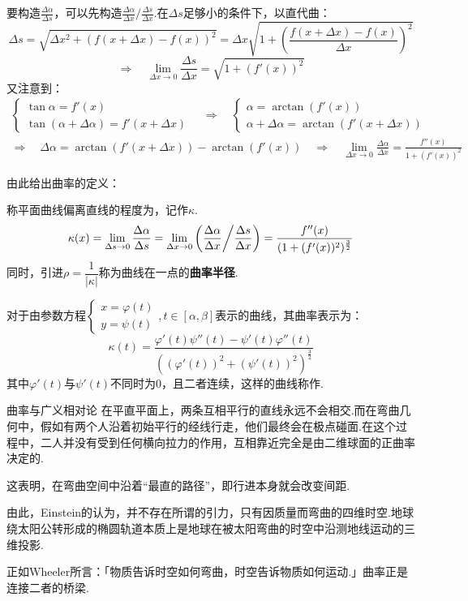 要构造$\frac{\Delta\alpha}{\Delta s}$，可以先构造$\frac{\Delta \alpha}{\Delta x}\big/\frac{\Delta s}{\Delta x}$.在$\Delta s$足够小的条件下，以直代曲：
\[\Delta s = \sqrt{\Delta x^2 + (f(x+\Delta x) - f(x))^2} = \Delta x \sqrt{1+\left(\frac{f(x+\Delta x)-f(x)}{\Delta x}\right)^2}\]
\[\Rightarrow\quad \lim\limits_{\Delta x \to 0}\frac{\Delta s}{\Delta x} = \sqrt{1+(f'(x))^2}\]
又注意到：
\begin{gather*}
\begin{cases}
    \tan \alpha = f'(x)\\
    \tan(\alpha + \Delta\alpha) = f'(x+\Delta x)
\end{cases} \quad\Rightarrow\quad \begin{cases}
    \alpha = \arctan(f'(x))\\
    \alpha + \Delta\alpha = \arctan(f'(x+\Delta x))
\end{cases}\\
\Rightarrow\quad \Delta\alpha = \arctan(f'(x+\Delta x)) - \arctan(f'(x))
\quad\Rightarrow\quad \lim\limits_{\Delta x \to 0}\frac{\Delta\alpha}{\Delta x} = \frac{f''(x)}{1+(f'(x))^2}
\end{gather*}

由此给出曲率的定义：

\begin{definition}
    \label{def:2DCurvature}
    称平面曲线偏离直线的程度为，记作$\kappa$.
    \[\kappa(x) = \lim\limits_{\Delta s \to 0}\frac{\Delta\alpha}{\Delta s} = \lim\limits_{\Delta x \to 0}\left(\frac{\Delta\alpha}{\Delta x}\middle/\frac{\Delta s}{\Delta x}\right) = \frac{f''(x)}{(1+(f'(x))^2)^{\frac{3}{2}}}\]
    同时，引进$\rho = \dfrac{1}{|\kappa|}$称为曲线在一点的\textbf{曲率半径}.

    对于由参数方程$\begin{cases}
        x = \varphi(t) \\
        y = \psi(t)
    \end{cases},t\in [\alpha,\beta]$表示的曲线，其曲率表示为：
    \[\kappa(t) = \frac{\varphi'(t)\psi''(t) - \psi'(t)\varphi''(t)}{((\varphi'(t))^2+(\psi'(t))^2)^{\frac{3}{2}}}\]
    其中$\varphi'(t)$与$\psi'(t)$不同时为$0$，且二者连续，这样的曲线称作.
\end{definition}

\begin{extension}{曲率与广义相对论}
    在平直平面上，两条互相平行的直线永远不会相交.而在弯曲几何中，假如有两个人沿着初始平行的经线行走，他们最终会在极点碰面.在这个过程中，二人并没有受到任何横向拉力的作用，互相靠近完全是由二维球面的正曲率决定的.
    
    这表明，在弯曲空间中沿着“最直的路径”，即行进本身就会改变间距.

    由此，Einstein的认为，并不存在所谓的引力，只有因质量而弯曲的四维时空.地球绕太阳公转形成的椭圆轨道本质上是地球在被太阳弯曲的时空中沿测地线运动的三维投影.

    正如Wheeler所言：「物质告诉时空如何弯曲，时空告诉物质如何运动.」曲率正是连接二者的桥梁.
\end{extension}


